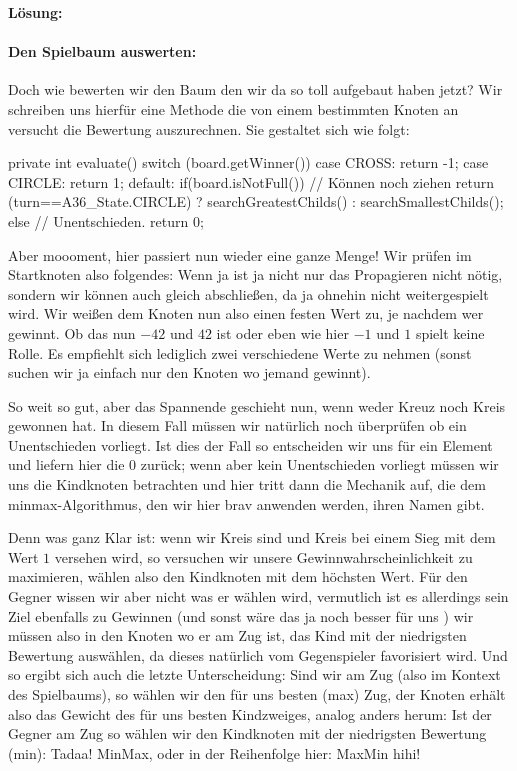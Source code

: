 \documentclass[table]{sopra-base}
\makeatletter
\newenvironment{solution}{\null\par\noindent\textbf{\textcolor{sob@col@uulm@cs}{Lösung:}}\newline\bgroup\color{black}\slshape\ignorespaces}{\egroup}
\makeatother
\begin{document}
\begin{solution}
\paragraph{Den Spielbaum auswerten:}
Doch wie bewerten wir den Baum den wir da so toll aufgebaut haben jetzt? Wir schreiben uns hierfür eine Methode  die von einem bestimmten Knoten an versucht die Bewertung auszurechnen. Sie gestaltet sich wie folgt:
{\upshape
\begin{java}
private int evaluate(){
    switch (board.getWinner()){
        case CROSS: return -1;
        case CIRCLE: return 1;
        default:
            if(board.isNotFull()) // Können noch ziehen
                return (turn==A36_State.CIRCLE) ? 
                            searchGreatestChilds() : 
                            searchSmallestChilds();
            else // Unentschieden.
                return 0;
    }
}
\end{java}
}
Aber moooment, hier passiert nun wieder eine ganze Menge! Wir prüfen im Startknoten also folgendes:  Wenn ja ist ja nicht nur das Propagieren nicht nötig, sondern wir können auch gleich abschließen, da ja ohnehin nicht weitergespielt wird. Wir weißen dem Knoten nun also einen festen Wert zu, je nachdem wer gewinnt. Ob das nun \(-42\) und \(42\) ist oder eben wie hier \(-1\) und \(1\) spielt keine Rolle. Es empfiehlt sich lediglich zwei verschiedene Werte zu nehmen (sonst suchen wir ja einfach nur den Knoten wo jemand gewinnt).\par{}
So weit so gut, aber das Spannende geschieht nun, wenn weder Kreuz noch Kreis gewonnen hat. In diesem Fall müssen 
wir natürlich noch überprüfen ob ein Unentschieden vorliegt. Ist dies der Fall so entscheiden wir uns für ein  Element und liefern hier die \(0\) zurück; wenn aber kein Unentschieden vorliegt müssen wir uns die Kindknoten betrachten und hier tritt dann die Mechanik auf, die dem minmax-Algorithmus, den wir hier brav anwenden werden, ihren Namen gibt.\par{}
Denn was ganz Klar ist: wenn wir Kreis sind und Kreis bei einem Sieg mit dem Wert \(1\) versehen wird, so versuchen wir unsere Gewinnwahrscheinlichkeit zu maximieren, wählen also den Kindknoten mit dem höchsten Wert. Für den Gegner wissen wir aber nicht was er wählen wird, vermutlich ist es allerdings sein Ziel ebenfalls zu Gewinnen (und sonst wäre das ja noch besser für uns \Laughey) wir müssen also in den Knoten wo er am Zug ist, das Kind mit der niedrigsten Bewertung auswählen, da dieses natürlich vom Gegenspieler favorisiert wird. Und so ergibt sich auch die letzte Unterscheidung: Sind wir am Zug (also im Kontext des Spielbaums), so wählen wir den für uns besten (max) Zug, der Knoten erhält also das Gewicht des für uns besten Kindzweiges, analog anders herum: Ist der Gegner am Zug so wählen wir den Kindknoten mit der niedrigsten Bewertung (min): Tadaa! MinMax, oder in der Reihenfolge hier: MaxMin hihi\Laughey!\par{}

\end{solution}
\end{document}
